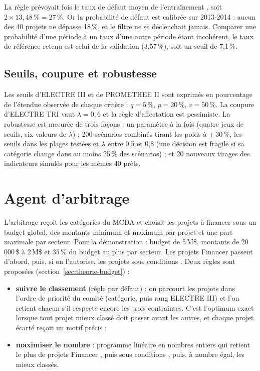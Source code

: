 \begin{encadre}
La règle prévoyait  fois le taux de défaut moyen de l'entraînement \fg{}, soit $2 \times 13{,}48\,\% = 27\,\%$.
Or la probabilité de défaut est calibrée sur 2013-2014 : aucun des 40 projets ne dépasse 18\,\%, et le filtre ne se
déclenchait jamais. Comparer une probabilité d'une période à un taux d'une autre période étant incohérent, le taux de
référence retenu est celui de la validation (3,57\,\%), soit un seuil de 7,1\,\%.
\end{encadre}

\subsection{Seuils, coupure et robustesse}

Les seuils d'ELECTRE III et de PROMETHEE II sont exprimés en pourcentage de l'étendue observée de chaque critère :
$q = 5\,\%$, $p = 20\,\%$, $v = 50\,\%$. La coupure d'ELECTRE TRI vaut $\lambda = 0{,}6$ et la règle d'affectation est
pessimiste. La robustesse est mesurée de trois façons : un paramètre à la fois (quatre jeux de seuils, six valeurs de
$\lambda$) ; 200 scénarios combinés tirant les poids à $\pm$\,30\,\%, les seuils dans les plages testées et $\lambda$
entre 0,5 et 0,8 (une décision est \og fragile \fg{} si sa catégorie change dans au moins 25\,\% des scénarios) ;
et 20 nouveaux tirages des indicateurs simulés pour les mêmes 40 prêts.

\section{Agent d'arbitrage}

L'arbitrage reçoit les catégories du MCDA et choisit les projets à financer sous un budget global, des montants
minimum et maximum par projet et une part maximale par secteur. Pour la démonstration : budget de 5\,M\$, montants
de 20\,000\,\$ à 2\,M\$ et 35\,\% du budget au plus par secteur. Les projets \og Financer \fg{} passent d'abord, puis,
si on l'autorise, les projets \og sous conditions \fg{}. Deux règles sont proposées (section~\ref{sec:theorie-budget}) :

\begin{itemize}
  \item \textbf{suivre le classement} (règle par défaut) : on parcourt les projets dans l'ordre de priorité du comité
        (catégorie, puis rang ELECTRE III) et l'on retient chacun s'il respecte encore les trois contraintes. C'est
        l'optimum exact lorsque tout projet mieux classé doit passer avant les autres, et chaque projet écarté reçoit
        un motif précis ;
  \item \textbf{maximiser le nombre} : programme linéaire en nombres entiers qui retient le plus de projets
        \og Financer \fg{}, puis \og sous conditions \fg{}, puis, à nombre égal, les mieux classés.
\end{itemize}

